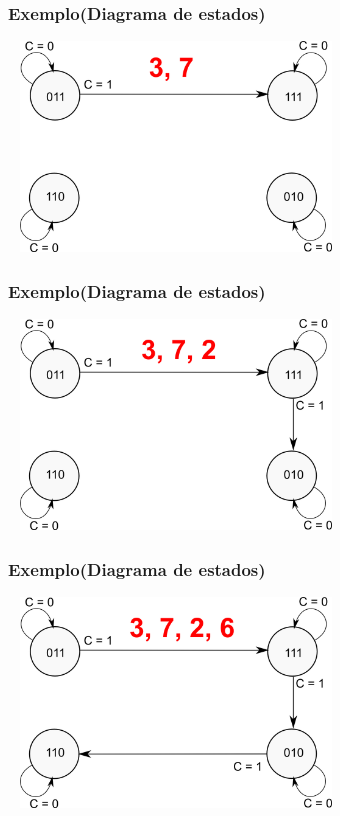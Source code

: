 \documentclass{beamer}
\begin{document}
\begin{frame}
  \frametitle{Exemplo(Diagrama de estados)}
  \begin{center}
    \includegraphics[height = 2.2in, width = 3.5in]
      {images/exemplo_projeto_2.png}
  \end{center}
\end{frame}

\begin{frame}
  \frametitle{Exemplo(Diagrama de estados)}
  \begin{center}
    \includegraphics[height = 2.2in, width = 3.5in]
      {images/exemplo_projeto_3.png}
  \end{center}
\end{frame}

\begin{frame}
  \frametitle{Exemplo(Diagrama de estados)}
  \begin{center}
    \includegraphics[height = 2.2in, width = 3.5in]
      {images/exemplo_projeto_4.png}
  \end{center}
\end{frame}
\end{document}
